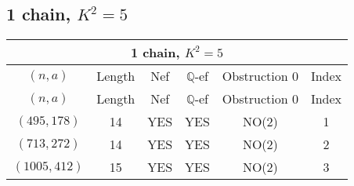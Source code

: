 \subsection{1 chain, $K^2 = 5$}
\begin{longtable}{|c|c|c|c|c|c|}
\hline
\multicolumn{6}{|c|}{1 chain, $K^2 = 5$}\\
\hline
$(n,a)$ & Length & Nef & $\mathbb Q$-ef & Obstruction 0 & Index\\
\hline
\endfirsthead

\hline
$(n,a)$ & Length & Nef & $\mathbb Q$-ef & Obstruction 0 & Index\\
\hline
\endhead
\hline
\endfoot

$(495, 178)$ & 14 & YES & YES & NO(2) & 1\\
$(713, 272)$ & 14 & YES & YES & NO(2) & 2\\
$(1005, 412)$ & 15 & YES & YES & NO(2) & 3
\end{longtable}
